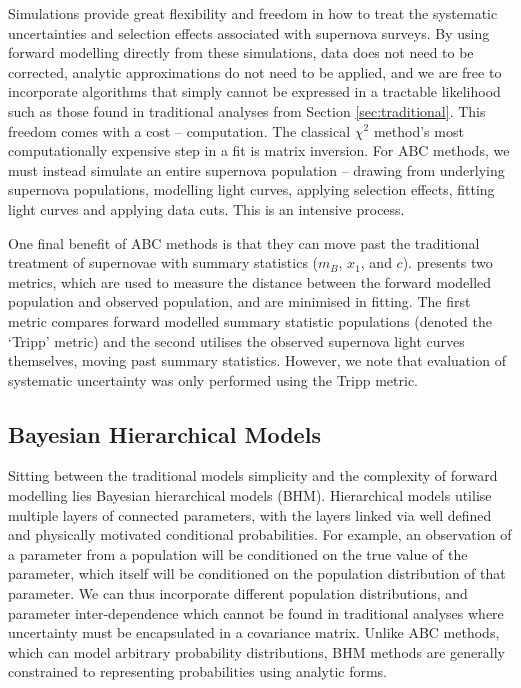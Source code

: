 \documentclass[twocolumn,trackchanges,tighten]{aastex62}
\begin{document}
Simulations provide great flexibility and freedom in how to treat the systematic uncertainties and selection effects associated with supernova surveys. By using forward modelling directly from these simulations, data does not need to be corrected, analytic approximations do not need to be applied, and we are free to incorporate algorithms that simply cannot be expressed in a tractable likelihood such as those found in traditional analyses from Section \ref{sec:traditional}. This freedom comes with a cost -- computation. The classical $\chi^2$ method's most computationally expensive step in a fit is matrix inversion. For ABC methods, we must instead simulate an entire supernova population -- drawing from underlying supernova populations, modelling light curves, applying selection effects, fitting light curves and applying data cuts. This is an intensive process.

One final benefit of ABC methods is that they can move past the traditional treatment of supernovae with summary statistics ($m_B$, $x_1$, and $c$). \citet{Jennings2016} presents two metrics, which are used to measure the distance between the forward modelled population and observed population, and are minimised in fitting. The first metric compares forward modelled summary statistic populations (denoted the `Tripp' metric) and the second utilises the observed supernova light curves themselves, moving past summary statistics. However, we note that evaluation of systematic uncertainty was only performed using the Tripp metric.

\subsection{Bayesian Hierarchical Models}

Sitting between the traditional models simplicity and the complexity of forward modelling lies Bayesian hierarchical models (BHM). Hierarchical models utilise multiple layers of connected parameters, with the layers linked via well defined and physically motivated conditional probabilities. For example, an observation of a parameter from a population will be conditioned on the true value of the parameter, which itself will be conditioned on the population distribution of that parameter. We can thus incorporate different population distributions, and parameter inter-dependence which cannot be found in traditional analyses where uncertainty must be encapsulated in a covariance matrix. Unlike ABC methods, which can model arbitrary probability distributions, BHM methods are generally constrained to representing probabilities using analytic forms.
\end{document}
